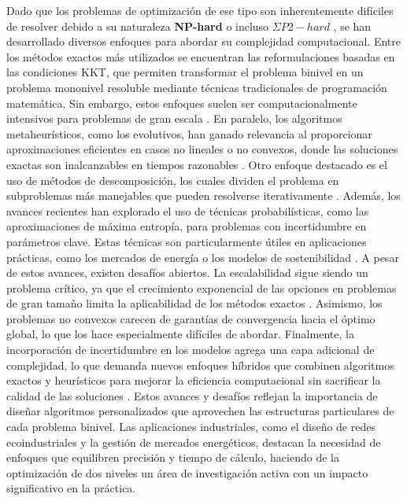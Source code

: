 Dado que los problemas de optimización de ese tipo son inherentemente difíciles de resolver debido a su naturaleza \textbf{NP-hard} \cite{Jeroslow1985ThePHNP,jonathan_f__bard_1991NP}
o incluso $\Sigma P2-hard$ \cite{phdthesisCerulli,DempeyZemkoho2020},
se han desarrollado diversos enfoques para abordar su complejidad computacional. Entre los métodos exactos más utilizados se encuentran las reformulaciones basadas en las condiciones KKT, que permiten transformar el problema binivel en un problema mononivel resoluble mediante técnicas tradicionales de programación matemática. Sin embargo, estos enfoques suelen ser computacionalmente intensivos para problemas de gran escala \cite{phdthesisCerulli}.
En paralelo, los algoritmos metaheurísticos, como los evolutivos, han ganado relevancia al proporcionar aproximaciones eficientes en casos no lineales o no convexos, donde las soluciones exactas son inalcanzables en tiempos razonables \cite{Sinha2017ARO}.
Otro enfoque destacado es el uso de métodos de descomposición, los cuales dividen el problema en subproblemas más manejables que pueden resolverse iterativamente \cite{Floudas1990ACO}.
Además, los avances recientes han explorado el uso de técnicas probabilísticas, como las aproximaciones de máxima entropía, para problemas con incertidumbre en parámetros clave.
Estas técnicas son particularmente útiles en aplicaciones prácticas, como los mercados de energía o los modelos de sostenibilidad \cite{SadddiquiNaturalGasSOS1}.
A pesar de estos avances, existen desafíos abiertos. La escalabilidad sigue siendo un problema crítico, ya que el crecimiento exponencial de las opciones en problemas de gran tamaño limita la aplicabilidad de los métodos exactos \cite{DempeyZemkoho2020}. Asimismo, los problemas no convexos carecen de garantías de convergencia hacia el óptimo global, lo que los hace especialmente difíciles de abordar. Finalmente, la incorporación de incertidumbre en los modelos agrega una capa adicional de complejidad, lo que demanda nuevos enfoques híbridos que combinen algoritmos exactos y heurísticos para mejorar la eficiencia computacional sin sacrificar la calidad de las soluciones \cite{phdthesisCerulli,Sinha2017ARO}. Estos avances y desafíos reflejan la importancia de diseñar algoritmos personalizados que aprovechen las estructuras particulares de cada problema binivel. Las aplicaciones industriales, como el diseño de redes ecoindustriales y la gestión de mercados energéticos, destacan la necesidad de enfoques que equilibren precisión y tiempo de cálculo, haciendo de la optimización de dos niveles un área de investigación activa con un impacto significativo en la práctica.

